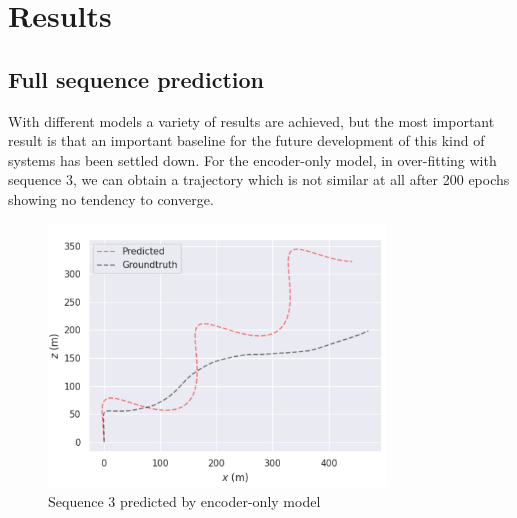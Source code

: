 \section{Results}\label{sec:results}

\subsection{Full sequence prediction}\label{subsec:full-sequence-prediction}
With different models a variety of results are achieved, but the most important result is that an important baseline for the future development of this kind of systems has been settled down.
For the encoder-only model, in over-fitting with sequence 3, we can obtain a trajectory which is not similar at all after 200 epochs showing no tendency to converge.
\begin{figure}[H]
    \centering
    \includegraphics[width=0.8\textwidth]{./images/6_1_trajectory_3_encoder_only}
    \caption{Sequence 3 predicted by encoder-only model}
    \label{fig:trajectory-3-encoder-only}
\end{figure}

